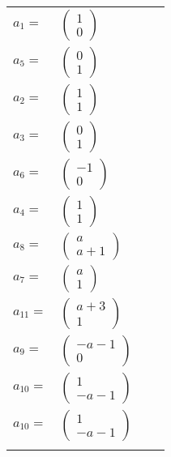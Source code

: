 \documentclass[1p]{elsarticle_modified}
\theoremstyle{definition}
\begin{document}
\begin{tabular}{m{7pt} m{180pt} m{7pt} m{180pt} }
\flushright $a_{1}=$&$\begin{pmatrix}1\\0\end{pmatrix}$ \\
\flushright $a_{5}=$&$\begin{pmatrix}0\\1\end{pmatrix}$ \\
\flushright $a_{2}=$&$\begin{pmatrix}1\\1\end{pmatrix}$ \\
\flushright $a_{3}=$&$\begin{pmatrix}0\\1\end{pmatrix}$ \\
\flushright $a_{6}=$&$\begin{pmatrix}-1\\0\end{pmatrix}$ \\
\flushright $a_{4}=$&$\begin{pmatrix}1\\1\end{pmatrix}$ \\
\flushright $a_{8}=$&$\begin{pmatrix}a\\a+1\end{pmatrix}$ \\
\flushright $a_{7}=$&$\begin{pmatrix}a\\1\end{pmatrix}$ \\
\flushright $a_{11}=$&$\begin{pmatrix}a+3\\1\end{pmatrix}$ \\
\flushright $a_{9}=$&$\begin{pmatrix}- a-1\\0\end{pmatrix}$ \\
\flushright $a_{10}=$&$\begin{pmatrix}1\\- a-1\end{pmatrix}$\\ \flushright $a_{10}=$&$\begin{pmatrix}1\\- a-1\end{pmatrix}$\\&\end{tabular}
\end{document}
